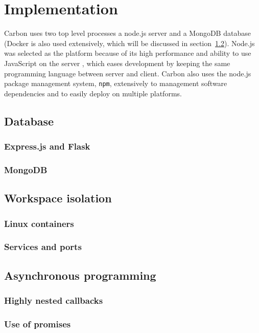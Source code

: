 \section{Implementation}

Carbon uses two top level processes a node.js server and a MongoDB database (Docker is also used extensively, which will be discussed in section~\ref{sec:docker}).
Node.js was selected as the platform because of its high performance and ability to use JavaScript on the server \autocite{tilkov2010node}, which eases development by keeping the same programming language between server and client.
Carbon also uses the node.js package management system, \texttt{npm}, extensively to management software dependencies and to easily deploy on multiple platforms. \autocite{lerner2011forge}




\subsection{Database}

\subsubsection{Express.js and Flask}
\subsubsection{MongoDB}
\subsection{Workspace isolation}
\label{sec:docker}
\subsubsection{Linux containers}
\subsubsection{Services and ports}
\subsection{Asynchronous programming}
\subsubsection{Highly nested callbacks}
\subsubsection{Use of promises}
